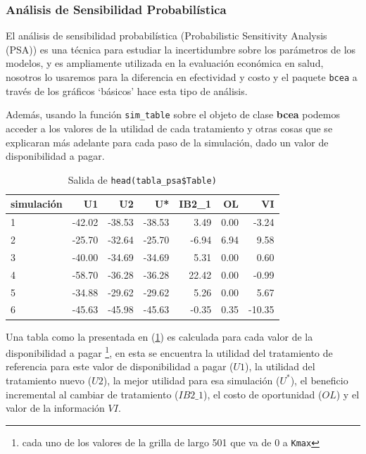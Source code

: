 \documentclass[12pt]{article}
\begin{document}
\subsubsection{Análisis de Sensibilidad Probabilística}

El análisis de sensibilidad probabilística (Probabilistic Sensitivity Analysis (PSA)) es una técnica para estudiar la incertidumbre sobre los parámetros de los modelos, y es ampliamente utilizada en la evaluación económica en salud, nosotros lo usaremos para la diferencia en efectividad y costo y el paquete \texttt{bcea} a través de los gráficos `básicos' hace esta tipo de análisis.\

Además, usando la función \texttt{sim\_table} sobre el objeto de clase \textbf{bcea} podemos acceder a los valores de la utilidad de cada tratamiento y otras cosas que se explicaran más adelante para  cada paso de la simulación, dado un valor de disponibilidad a pagar.



\begin{table}[ht]
\centering
\begin{tabular}{lrrrrrr}
  \hline
simulación & U1 & U2 & U* & IB2\_1 & OL & VI \\ 
  \hline
1 & -42.02 & -38.53 & -38.53 & 3.49 & 0.00 & -3.24 \\ 
  2 & -25.70 & -32.64 & -25.70 & -6.94 & 6.94 & 9.58 \\ 
  3 & -40.00 & -34.69 & -34.69 & 5.31 & 0.00 & 0.60 \\ 
  4 & -58.70 & -36.28 & -36.28 & 22.42 & 0.00 & -0.99 \\ 
  5 & -34.88 & -29.62 & -29.62 & 5.26 & 0.00 & 5.67 \\ 
  6 & -45.63 & -45.98 & -45.63 & -0.35 & 0.35 & -10.35 \\ 
   \hline
\end{tabular}
\caption{Salida de \texttt{head(tabla\_psa\$Table)}}
\label{Tabla:Resultadosevpi}
\end{table}


Una tabla como la presentada en (\ref{Tabla:Resultadosevpi}) es calculada para cada valor de la disponibilidad a pagar \footnote{cada uno de los valores de la grilla de largo 501 que va de 0 a \texttt{Kmax}}, en esta se encuentra la utilidad del tratamiento de referencia para este valor de disponibilidad a pagar ($U1$), la utilidad del tratamiento nuevo ($U2$), la mejor utilidad para esa simulación ($U^*$), el beneficio incremental al cambiar de tratamiento ($IB2\_1$), el costo de oportunidad ($OL$) y el valor de la información $VI$.
\end{document}
